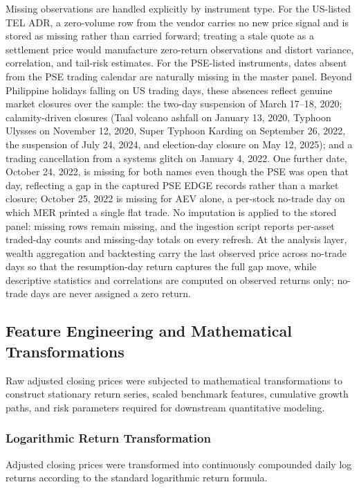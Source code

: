 Missing observations are handled explicitly by instrument type. For the US-listed TEL ADR, a zero-volume row from the vendor carries no new price signal and is stored as missing rather than carried forward; treating a stale quote as a settlement price would manufacture zero-return observations and distort variance, correlation, and tail-risk estimates. For the PSE-listed instruments, dates absent from the PSE trading calendar are naturally missing in the master panel. Beyond Philippine holidays falling on US trading days, these absences reflect genuine market closures over the sample: the two-day suspension of March 17--18, 2020; calamity-driven closures (Taal volcano ashfall on January 13, 2020, Typhoon Ulysses on November 12, 2020, Super Typhoon Karding on September 26, 2022, the suspension of July 24, 2024, and election-day closure on May 12, 2025); and a trading cancellation from a systems glitch on January 4, 2022. One further date, October 24, 2022, is missing for both names even though the PSE was open that day, reflecting a gap in the captured PSE EDGE records rather than a market closure; October 25, 2022 is missing for AEV alone, a per-stock no-trade day on which MER printed a single flat trade. No imputation is applied to the stored panel: missing rows remain missing, and the ingestion script reports per-asset traded-day counts and missing-day totals on every refresh. At the analysis layer, wealth aggregation and backtesting carry the last observed price across no-trade days so that the resumption-day return captures the full gap move, while descriptive statistics and correlations are computed on observed returns only; no-trade days are never assigned a zero return.

\subsection{Feature Engineering and Mathematical Transformations}

Raw adjusted closing prices were subjected to mathematical transformations to construct stationary return series, scaled benchmark features, cumulative growth paths, and risk parameters required for downstream quantitative modeling.

\subsubsection{Logarithmic Return Transformation}

Adjusted closing prices were transformed into continuously compounded daily log returns according to the standard logarithmic return formula.

